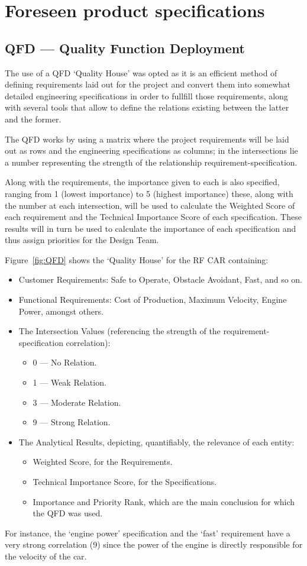 \section{Foreseen product specifications}%
\label{sec:org31f7574}
\subsection{QFD --- Quality Function Deployment}
The use of a QFD `Quality House' was opted as it is an efficient method of defining requirements laid out for the project and convert them into somewhat detailed engineering specifications in order to fullfill those requirements, along with several tools that allow to define the relations existing between the latter and the former.

The QFD works by using a matrix where the project requirements will be laid out as rows and the engineering specifications as columns; in the intersections lie a number representing the strength of the relationship requirement-specification.

Along with the requirements, the importance given to each is also specified, ranging from 1 (lowest importance) to 5 (highest importance) these, along with the number at each intersection, will be used to calculate the Weighted Score of each requirement and the Technical Importance Score of each specification. These results will in turn be used to calculate the importance of each specification and thus assign priorities for the Design Team.

Figure~\ref{fig:QFD} shows the `Quality House' for the RF CAR containing:
\begin{itemize}
\item Customer Requirements: Safe to Operate, Obstacle Avoidant, Fast, and so
  on.
\item Functional Requirements: Cost of Production, Maximum Velocity, Engine
  Power, amongst others.
\item The Intersection Values (referencing the strength of the
  requirement-specification correlation):
  \begin{itemize}
  \item 0 --- No Relation.
  \item 1 --- Weak Relation.
  \item 3 --- Moderate Relation.
  \item 9 --- Strong Relation.
  \end{itemize}
\item The Analytical Results, depicting, quantifiably, the relevance of each
  entity:
  \begin{itemize}
  \item Weighted Score, for the Requirements.
  \item Technical Importance Score, for the Specifications.
  \item Importance and Priority Rank, which are the main conclusion for which
    the QFD was used.
  \end{itemize}
\end{itemize}
For instance, the `engine power' specification and the `fast' requirement have a
very strong correlation (9) since the power of the engine is directly
responsible for the velocity of the car.

